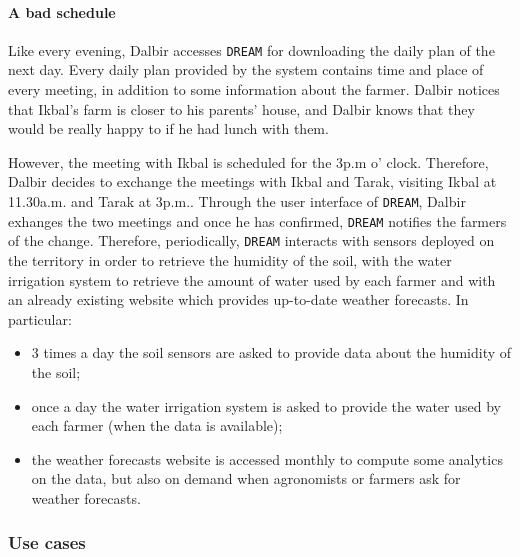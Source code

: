 \documentclass{article}
\begin{document}
\paragraph{A bad schedule}
Like every evening, Dalbir accesses \verb|DREAM| for downloading the daily plan of the next day. Every daily plan provided by the system contains time and place of every meeting, in addition to some information about the farmer. Dalbir notices that Ikbal's farm is closer to his parents' house, and Dalbir knows that they would be really happy to if he had lunch with them.\par
\noindent However, the meeting with Ikbal is scheduled for the 3p.m o' clock. Therefore, Dalbir decides to exchange the meetings with Ikbal and Tarak, visiting Ikbal at 11.30a.m. and Tarak at 3p.m.. Through the user interface of \verb|DREAM|, Dalbir exhanges the two meetings and once he has confirmed, \verb|DREAM| notifies the farmers of the change.
\noindent Therefore, periodically, \verb|DREAM| interacts with sensors deployed on the territory in order to retrieve the humidity of the soil, with the water irrigation system to retrieve the amount of water used by each farmer and with an already existing website which provides up-to-date weather forecasts. In particular:
\begin{itemize}
    \item 3 times a day the soil sensors are asked to provide data about the humidity of the soil;
    \item once a day the water irrigation system is asked to provide the water used by each farmer (when the data is available);
    \item the weather forecasts website is accessed monthly to compute some analytics on the data, but also on demand when agronomists or farmers ask for weather forecasts.
\end{itemize}

\subsubsection{Use cases}
\end{document}
